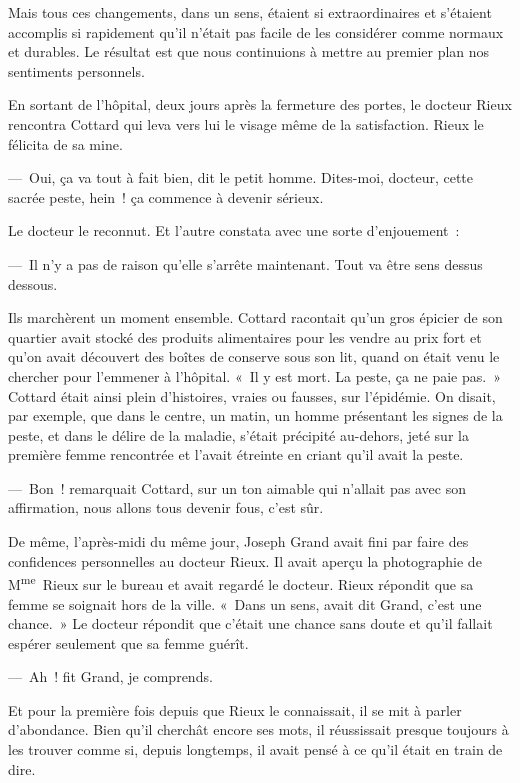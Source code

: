 \documentclass[french,twoside]{book} %
\begin{document}
Mais tous ces changements, dans un sens, étaient si extraordinaires et s’étaient accomplis si rapidement qu’il n’était pas facile de les considérer comme normaux et durables. Le résultat est que nous continuions à mettre au premier plan nos sentiments personnels.\par
En sortant de l’hôpital, deux jours après la fermeture des portes, le docteur Rieux rencontra Cottard qui leva vers lui le visage même de la satisfaction. Rieux le félicita de sa mine.\par
— Oui, ça va tout à fait bien, dit le petit homme. Dites-moi, docteur, cette sacrée peste, hein ! ça commence à devenir sérieux.\par
Le docteur le reconnut. Et l’autre constata avec une sorte d’enjouement :\par
— Il n’y a pas de raison qu’elle s’arrête maintenant. Tout va être sens dessus dessous.\par
Ils marchèrent un moment ensemble. Cottard racontait qu’un gros épicier de son quartier avait stocké des produits alimentaires pour les vendre au prix fort et qu’on avait découvert des boîtes de conserve sous son lit, quand on était venu le chercher pour l’emmener à l’hôpital. « Il y est mort. La peste, ça ne paie pas. » Cottard était ainsi plein d’histoires, vraies ou fausses, sur l’épidémie. On disait, par exemple, que dans le centre, un matin, un homme présentant les signes de la peste, et dans le délire de la maladie, s’était précipité au-dehors, jeté sur la première femme rencontrée et l’avait étreinte en criant qu’il avait la peste.\par
— Bon ! remarquait Cottard, sur un ton aimable qui n’allait pas avec son affirmation, nous allons tous devenir fous, c’est sûr.\par
De même, l’après-midi du même jour, Joseph Grand avait fini par faire des confidences personnelles au docteur Rieux. Il avait aperçu la photographie de M\textsuperscript{me} Rieux sur le bureau et avait regardé le docteur. Rieux répondit que sa femme se soignait hors de la ville. « Dans un sens, avait dit Grand, c’est une chance. » Le docteur répondit que c’était une chance sans doute et qu’il fallait espérer seulement que sa femme guérît.\par
— Ah ! fit Grand, je comprends.\par
Et pour la première fois depuis que Rieux le connaissait, il se mit à parler d’abondance. Bien qu’il cherchât encore ses mots, il réussissait presque toujours à les trouver comme si, depuis longtemps, il avait pensé à ce qu’il était en train de dire.\par
\end{document}
